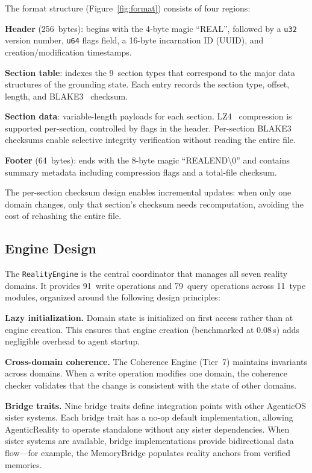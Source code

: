\documentclass[10pt, twocolumn]{article}
\begin{document}
The format structure (Figure~\ref{fig:format}) consists of four regions:

\textbf{Header} (256~bytes): begins with the 4-byte magic ``REAL'', followed by a \texttt{u32} version number, \texttt{u64} flags field, a 16-byte incarnation ID (UUID), and creation/modification timestamps.

\textbf{Section table}: indexes the 9~section types that correspond to the major data structures of the grounding state. Each entry records the section type, offset, length, and BLAKE3~\cite{blake3_2020} checksum.

\textbf{Section data}: variable-length payloads for each section. LZ4~\cite{lz4_2024} compression is supported per-section, controlled by flags in the header. Per-section BLAKE3 checksums enable selective integrity verification without reading the entire file.

\textbf{Footer} (64~bytes): ends with the 8-byte magic ``REALEND\textbackslash 0'' and contains summary metadata including compression flags and a total-file checksum.

The per-section checksum design enables incremental updates: when only one domain changes, only that section's checksum needs recomputation, avoiding the cost of rehashing the entire file.

\subsection{Engine Design}
\label{sec:engine}

The \texttt{RealityEngine} is the central coordinator that manages all seven reality domains. It provides 91~write operations and 79~query operations across 11~type modules, organized around the following design principles:

\textbf{Lazy initialization.} Domain state is initialized on first access rather than at engine creation. This ensures that engine creation (benchmarked at 0.08\,\textmu{}s) adds negligible overhead to agent startup.

\textbf{Cross-domain coherence.} The Coherence Engine (Tier~7) maintains invariants across domains. When a write operation modifies one domain, the coherence checker validates that the change is consistent with the state of other domains.

\textbf{Bridge traits.} Nine bridge traits define integration points with other AgenticOS sister systems. Each bridge trait has a no-op default implementation, allowing AgenticReality to operate standalone without any sister dependencies. When sister systems are available, bridge implementations provide bidirectional data flow---for example, the MemoryBridge populates reality anchors from verified memories.
\end{document}
